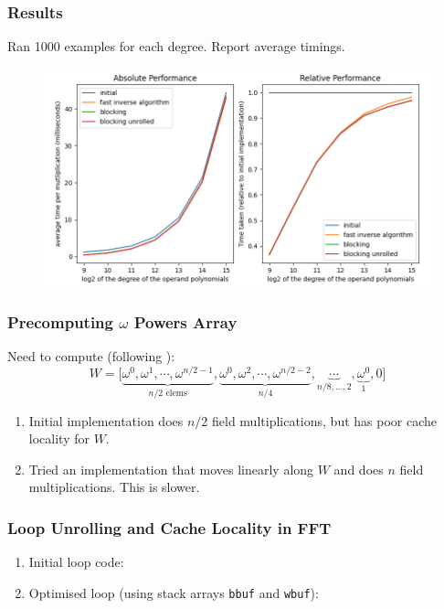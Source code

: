 \documentclass{beamer}
\begin{document}
\begin{frame}
    \frametitle{Results}
    
    Ran 1000 examples for each degree. Report average timings.

    \begin{figure}
        \includegraphics[width=\textwidth]{fastmult.png}
    \end{figure}
\end{frame}

\begin{frame}
    \frametitle{Precomputing $\omega$ Powers Array}

    Need to compute (following \cite{monagan}):
    \begin{equation*}
        W = \big[
            \underbrace{\omega^0, \omega^1, \cdots, \omega^{n/2 - 1}}_{n/2 \text{ elems}},
            \underbrace{\omega^0, \omega^2, \cdots, \omega^{n/2 - 2}}_{n/4},
            \underbrace{\cdots}_{n/8,\dots,2},
            \underbrace{\omega^0}_{1},
            0
        \big]
    \end{equation*}
    
    \pause \vfill

    \begin{enumerate}[label=(\roman*)]
        \item Initial implementation does $n/2$ field multiplications,
            but has poor cache locality for $W$. \pause \smallbreak
        \item Tried an implementation that moves linearly along $W$ and does $n$ 
            field multiplications. \pause This is slower.
    \end{enumerate}
\end{frame}

\begin{frame}
    \frametitle{Loop Unrolling and Cache Locality in FFT}

    \begin{enumerate}[label=(\roman*)]
        \item Initial loop code:
            
            \pause \smallbreak
        \item Optimised loop (using stack arrays \texttt{bbuf} and
            \texttt{wbuf}): \pause
            
    \end{enumerate}
\end{frame}
\end{document}
